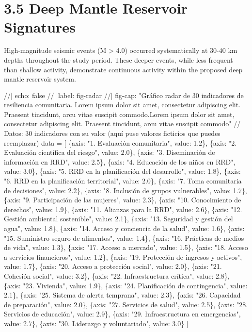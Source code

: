 \documentclass[
  spanish,
  letterpaper,
]{book}
\newenvironment{Shaded}{\begin{snugshade}}{\end{snugshade}}
\newcommand{\NormalTok}[1]{\textcolor[rgb]{0.00,0.23,0.31}{#1}}
\begin{document}
\section{3.5 Deep Mantle Reservoir
Signatures}\label{deep-mantle-reservoir-signatures}

High-magnitude seismic events (M \textgreater{} 4.0) occurred
systematically at 30-40 km depths throughout the study period. These
deeper events, while less frequent than shallow activity, demonstrate
continuous activity within the proposed deep mantle reservoir system.

\begin{Shaded}
\begin{Highlighting}[]
\NormalTok{//| echo: false}
\NormalTok{//| label: fig{-}radar}
\NormalTok{//| fig{-}cap: "Gráfico radar de 30 indicadores de resiliencia comunitaria. Lorem ipsum dolor sit amet, consectetur adipiscing elit. Praesent tincidunt, arcu vitae suscipit commodo.Lorem ipsum dolor sit amet, consectetur adipiscing elit. Praesent tincidunt, arcu vitae suscipit commodo"}
\NormalTok{// Datos: 30 indicadores con su valor (aquí puse valores ficticios que puedes reemplazar)}
\NormalTok{data = [}
\NormalTok{  \{axis: "1. Evaluación comunitaria", value: 1.2\},}
\NormalTok{  \{axis: "2. Evaluación científica del riesgo", value: 2.0\},}
\NormalTok{  \{axis: "3. Diseminación de información en RRD", value: 2.5\},}
\NormalTok{  \{axis: "4. Educación de los niños en RRD", value: 3.0\},}
\NormalTok{  \{axis: "5. RRD en la planificación del desarrollo", value: 1.8\},}
\NormalTok{  \{axis: "6. RRD en la planificación territorial", value: 2.0\},}
\NormalTok{  \{axis: "7. Toma comunitaria de decisiones", value: 2.2\},}
\NormalTok{  \{axis: "8. Inclusión de grupos vulnerables", value: 1.7\},}
\NormalTok{  \{axis: "9. Participación de las mujeres", value: 2.3\},}
\NormalTok{  \{axis: "10. Conocimiento de derechos", value: 1.9\},}
\NormalTok{  \{axis: "11. Alianzas para la RRD", value: 2.6\},}
\NormalTok{  \{axis: "12. Gestión ambiental sostenible", value: 2.1\},}
\NormalTok{  \{axis: "13. Seguridad y gestión del agua", value: 1.8\},}
\NormalTok{  \{axis: "14. Acceso y conciencia de la salud", value: 1.6\},}
\NormalTok{  \{axis: "15. Suministro seguro de alimentos", value: 1.4\},}
\NormalTok{  \{axis: "16. Prácticas de medios de vida", value: 1.3\},}
\NormalTok{  \{axis: "17. Acceso a mercado", value: 1.5\},}
\NormalTok{  \{axis: "18. Acceso a servicios financieros", value: 1.2\},}
\NormalTok{  \{axis: "19. Protección de ingresos y activos", value: 1.7\},}
\NormalTok{  \{axis: "20. Acceso a protección social", value: 2.0\},}
\NormalTok{  \{axis: "21. Cohesión social", value: 3.2\},}
\NormalTok{  \{axis: "22. Infraestructura crítica", value: 2.8\},}
\NormalTok{  \{axis: "23. Vivienda", value: 1.9\},}
\NormalTok{  \{axis: "24. Planificación de contingencia", value: 2.1\},}
\NormalTok{  \{axis: "25. Sistema de alerta temprana", value: 2.3\},}
\NormalTok{  \{axis: "26. Capacidad de preparación", value: 2.0\},}
\NormalTok{  \{axis: "27. Servicios de salud", value: 2.5\},}
\NormalTok{  \{axis: "28. Servicios de educación", value: 2.9\},}
\NormalTok{  \{axis: "29. Infraestructura en emergencias", value: 2.7\},}
\NormalTok{  \{axis: "30. Liderazgo y voluntariado", value: 3.0\}}
\NormalTok{]}


\end{Highlighting}
\end{Shaded}
\end{document}
